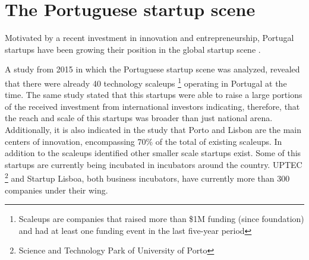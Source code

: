 	\section{The Portuguese startup scene}
    	Motivated by a recent investment in innovation and entrepreneurship, Portugal startups have been growing their position in the global startup scene \cite{Coleman2015}.  
        
       A study from 2015 \citet{StartupEuropePartnership2015} in which the Portuguese startup scene was analyzed, revealed that there were already 40 technology scaleups \footnote{Scaleups are companies that raised more than \$1M funding (since foundation) and had at least one funding event in the last five-year period } operating in Portugal at the time. The same study stated that this startups were able to raise a large portions of the received investment from international investors indicating, therefore, that the reach and scale of this startups was broader than just national arena. Additionally, it is also indicated in the study that Porto and Lisbon are the main centers of innovation, encompassing 70\% of the total of existing scaleups. In addition to the scaleups identified other smaller scale startups exist. Some of this startups are currently being incubated in incubators around the country. UPTEC \footnote{Science and Technology Park of University of Porto} and Startup Lisboa, both business incubators, have currently more than 300 companies \cite{Uptec,StartupLisboa} under their wing. 
